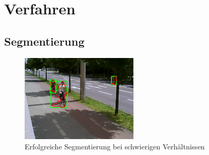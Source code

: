 \documentclass[conference]{IEEEtran}
\begin{document}
%



\section{Verfahren}

\subsection{Segmentierung}

\begin{figure}
\includegraphics[width=0.5\textwidth]{ds10_contour}
\caption{Erfolgreiche Segmentierung bei schwierigen Verhältnissen}
\end{figure}
\end{document}
